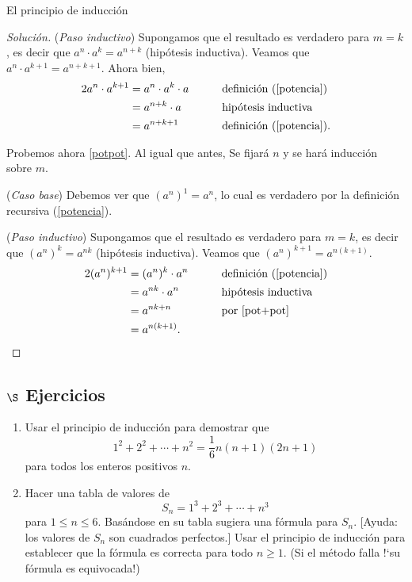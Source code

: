 \begin{section}{El principio de inducción}
\begin{proof}[Solución]
    \noindent (\textit{Paso  inductivo}) Supongamos que el resultado es verdadero para $m=k$, es decir que $a^{n} \cdot a^k = a^{n+k}$ (hipótesis inductiva). Veamos que  $a^{n} \cdot a^{k+1} = a^{n+k+1}$. Ahora bien, 
    \begin{alignat*}2
        a^{n} \cdot a^{k+1} &= a^{n} \cdot a^{k} \cdot a &\qquad  &\text{definición (\ref{potencia})} \\
        &= a^{n+k} \cdot a &\qquad &\text{hipótesis inductiva} \\
        &= a^{n+k+1} &\qquad  &\text{definición (\ref{potencia})}. 
    \end{alignat*}
    
    Probemos ahora \ref{potpot}. Al igual que antes, Se fijará $n$ y se hará inducción sobre $m$.
    
    \noindent(\textit{Caso  base}) Debemos ver que $(a^n)^1 = a^n$, lo cual es verdadero por la definición recursiva (\ref{potencia}). 
    
    
    \noindent (\textit{Paso  inductivo}) Supongamos que el resultado es verdadero para $m=k$, es decir que  $(a^n)^k = a^{nk}$ (hipótesis inductiva). Veamos que  $(a^n)^{k+1} = a^{n(k+1)}$. 
    \begin{alignat*}2
        (a^n)^{k+1} &= (a^n)^{k} \cdot a^n &\qquad  &\text{definición (\ref{potencia})} \\
        &= a^{nk} \cdot a^n &\qquad &\text{hipótesis inductiva} \\
        &= a^{nk+n} &\qquad  &\text{por \ref{pot+pot}}\\
        &= a^{n(k+1)}. &\qquad  &
    \end{alignat*}
\end{proof}

\subsection*{$\S$ Ejercicios}
\begin{enumerate}
\item Usar el principio de inducción para demostrar que
$$
1^2+2^2+\cdots +n^2 = \frac16 n(n+1)(2n +1)
$$
para todos los enteros positivos $n$.

\item Hacer una tabla de valores de
$$
S_n = 1^3+2^3+\cdots +n^3
$$
para $1 \le n\le 6$. Basándose en su tabla sugiera una fórmula para $S_n$. [Ayuda: los valores de $S_n$ son cuadrados perfectos.] Usar el principio de inducción para establecer que la fórmula es correcta para todo $n\ge 1$. (Si el método falla !`su fórmula es equivocada!)


\end{enumerate}
\end{section}
